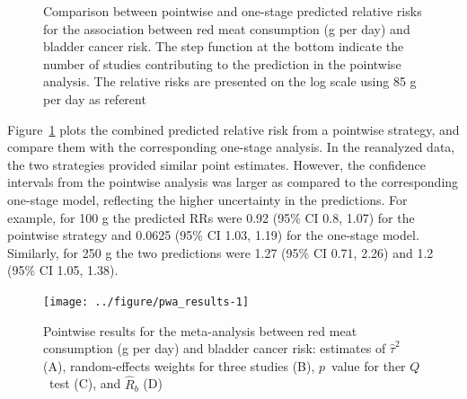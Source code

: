\documentclass[11pt,a4paper,twoside,openany]{book}\usepackage{knitr}
\begin{document}
{\begin{knitrout}
\begin{figure}[h]
\caption[Comparison between pointwise and one-stage predicted relative risks for the association between red meat consumption (g per day) and bladder cancer risk]{Comparison between pointwise and one-stage predicted relative risks for the association between red meat consumption (g per day) and bladder cancer risk. The step function at the bottom indicate the number of studies contributing to the prediction in the pointwise analysis. The relative risks are presented on the log scale using 85 g per day as referent}\label{fig:pwa}
\end{figure}


\end{knitrout}

\noindent Figure~\ref{fig:pwa} plots the combined predicted relative risk from a pointwise strategy, and compare them with the corresponding one-stage analysis. In the reanalyzed data, the two strategies provided similar point estimates. However, the confidence intervals from the pointwise analysis was larger as compared to the corresponding one-stage model, reflecting the higher uncertainty in the predictions. For example, for 100 g the predicted RRs were 0.92 (95\% CI 0.8, 1.07) for the pointwise strategy and 0.0625 (95\% CI 1.03, 1.19) for the one-stage model. Similarly, for 250 g the two predictions were 1.27 (95\% CI 0.71, 2.26) and 1.2 (95\% CI 1.05, 1.38).

\begin{knitrout}\footnotesize
{}\color{fgcolor}\begin{figure}[ht!]

{\centering \texttt{[image: ../figure/pwa\_results-1]} 

}

\caption[Pointwise results for the meta-analysis between red meat consumption (g per day) and bladder cancer risk]{Pointwise results for the meta-analysis between red meat consumption (g per day) and bladder cancer risk: estimates of $\hat \tau^2$ (A), random-effects weights for three studies (B), $p$~value for ther $Q$~test (C), and $\hat R_b$ (D)}\label{fig:pwa_results}
\end{figure}


\end{knitrout}

}
\end{document}
